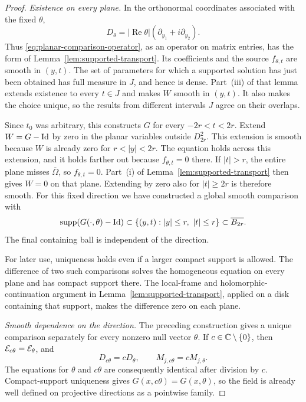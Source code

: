 \begin{proof}
\emph{Existence on every plane.}
In the orthonormal coordinates associated with the fixed $\theta$,
\[
 D_\theta=|\operatorname{Re}\theta|
                 (\partial_{y_1}+i\partial_{y_2}).
\]
Thus \eqref{eq:planar-comparison-operator}, as an operator on matrix
entries, has the form of Lemma~\ref{lem:supported-transport}.
Its coefficients and the source $f_{\theta,t}$ are smooth in $(y,t)$.
The set of parameters for which a supported solution has just been
obtained has full measure in $J$, and hence is dense. Part~\textup{(iii)}
of that lemma extends existence to every $t\in J$ and makes $W$
smooth in $(y,t)$. It also makes the choice unique, so the results
from different intervals $J$ agree on their overlaps.

Since $t_0$ was arbitrary, this constructs $G$ for every
$-2r<t<2r$. Extend $W=G-\mathrm{Id}$ by zero in the planar variables
outside $D_{2r}^2$. This extension is smooth because $W$ is already
zero for $r<|y|<2r$. The equation holds across this extension, and
it holds farther out because $f_{\theta,t}=0$ there. If $|t|>r$,
the entire plane misses $\overline\Omega$, so $f_{\theta,t}=0$.
Part~\textup{(i)} of Lemma~\ref{lem:supported-transport} then gives
$W=0$ on that plane. Extending by zero also for $|t|\geq2r$ is
therefore smooth. For this fixed direction we have constructed a
global smooth comparison with
\begin{equation}\label{eq:comparison-uniform-support}
 \operatorname{supp}(G(\cdot,\theta)-\mathrm{Id})
 \subset\{(y,t):|y|\leq r,\ |t|\leq r\}
 \subset\overline{B_{2r}}.
\end{equation}
The final containing ball is independent of the direction.

For later use, uniqueness holds even if a larger compact support is
allowed. The difference of two such comparisons solves the
homogeneous equation on every plane and has compact support there.
The local-frame and holomorphic-continuation argument in
Lemma~\ref{lem:supported-transport}, applied on a disk containing
that support, makes the difference zero on each plane.

\emph{Smooth dependence on the direction.}
The preceding construction gives a unique comparison separately for
every nonzero null vector $\theta$. If $c\in\mathbb C\setminus\{0\}$,
then $\mathcal E_{c\theta}=\mathcal E_\theta$, and
\[
 D_{c\theta}=cD_\theta,
 \qquad M_{j,c\theta}=cM_{j,\theta}.
\]
The equations for $\theta$ and $c\theta$ are consequently identical
after division by $c$. Compact-support uniqueness gives
$G(x,c\theta)=G(x,\theta)$, so the field is already well defined
on projective directions as a pointwise family.


\end{proof}
